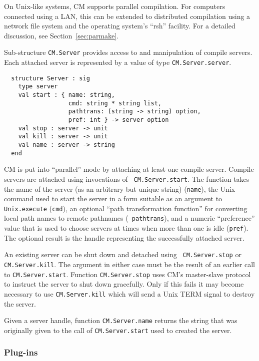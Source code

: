\documentclass{article}
\begin{document}
On Unix-like systems, CM supports parallel compilation.  For computers
connected using a LAN, this can be extended to distributed compilation
using a network file system and the operating system's ``rsh''
facility.  For a detailed discussion, see Section~\ref{sec:parmake}.

Sub-structure {\tt CM.Server} provides access to and manipulation of
compile servers.  Each attached server is represented by a value of
type {\tt CM.Server.server}.

\begin{verbatim}
  structure Server : sig
    type server
    val start : { name: string,
                  cmd: string * string list,
                  pathtrans: (string -> string) option,
                  pref: int } -> server option
    val stop : server -> unit
    val kill : server -> unit
    val name : server -> string
  end
\end{verbatim}

CM is put into ``parallel'' mode by attaching at least one compile
server.  Compile servers are attached using invocations of {\tt
CM.Server.start}.  The function takes the name of the server (as an
arbitrary but unique string) ({\tt name}), the Unix command used to
start the server in a form suitable as an argument to {\tt
Unix.execute} ({\tt cmd}), an optional ``path transformation
function'' for converting local path names to remote pathnames ({\tt
pathtrans}), and a numeric ``preference'' value that is used to choose
servers at times when more than one is idle ({\tt pref}).  The
optional result is the handle representing the successfully attached
server.

An existing server can be shut down and detached using {\tt
CM.Server.stop} or {\tt CM.Server.kill}.  The argument in either case
must be the result of an earlier call to {\tt CM.Server.start}.
Function {\tt CM.Server.stop} uses CM's master-slave protocol to
instruct the server to shut down gracefully.  Only if this fails it
may become necessary to use {\tt CM.Server.kill} which will send a
Unix TERM signal to destroy the server.

Given a server handle, function {\tt CM.Server.name} returns the
string that was originally given to the call of {\tt CM.Server.start}
used to created the server.

\subsubsection*{Plug-ins}
\end{document}
